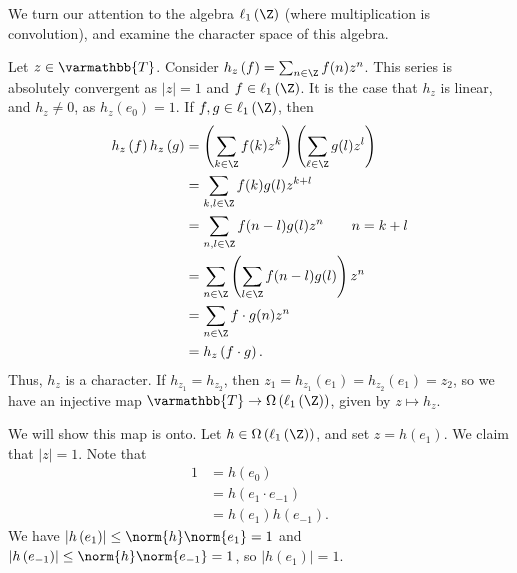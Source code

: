 \documentclass[10pt]{mypackage}
\renewcommand*{\mathbb}[1]{\varmathbb{#1}}
\newcommand{\T}{\mathbb{T}}
\begin{document}
\begin{example}
  We turn our attention to the algebra $\ell_1\left(\Z\right)$ (where multiplication is convolution), and examine the character space of this algebra.\newline

  Let $z\in \T$. Consider $h_z\left(f\right) = \sum_{n\in \Z}f(n)z^n$. This series is absolutely convergent as $\left\vert z \right\vert = 1$ and $f\in \ell_1\left(\Z\right)$. It is the case that $h_z$ is linear, and $h_z\neq 0$, as $h_z\left(e_0\right) = 1$. If $f,g\in \ell_1\left(\Z\right)$, then
  \begin{align*}
    h_z\left(f\right)h_z\left(g\right) &= \left(\sum_{k\in \Z}f(k)z^k\right)\left(\sum_{\ell \in \Z}g(l)z^l\right)\\
                                       &= \sum_{k,l\in \Z}f(k)g(l)z^{k+l}\\
                                       &= \sum_{n,l\in \Z}f(n-l)g(l)z^{n}\tag*{$n=k+l$}\\
                                       &= \sum_{n\in \Z}\left(\sum_{l\in\Z}f(n-l)g(l)\right)z^{n}\\
                                       &= \sum_{n\in \Z}f\cdot g(n)z^n\\
                                       &= h_z\left(f\cdot g\right).
  \end{align*}
  Thus, $h_z$ is a character. If $h_{z_1} = h_{z_2}$, then $z_1 = h_{z_1}\left(e_1\right) = h_{z_2}\left(e_1\right) = z_2$, so we have an injective map $\T\rightarrow \Omega\left(\ell_1\left(\Z\right)\right)$, given by $z\mapsto h_z$.\newline

  We will show this map is onto. Let $h\in \Omega\left(\ell_1\left(\Z\right)\right)$, and set $z = h\left(e_1\right)$. We claim that $\left\vert z \right\vert = 1$. Note that
  \begin{align*}
    1 &= h\left(e_0\right)\\
      &= h\left(e_1\cdot e_{-1}\right)\\
      &= h\left(e_{1}\right)h\left(e_{-1}\right).
  \end{align*}
  We have $\left\vert h\left(e_1\right) \right\vert\leq \norm{h}\norm{e_1} = 1$ and $\left\vert h\left(e_{-1}\right) \right\vert \leq \norm{h}\norm{e_{-1}} = 1$, so $\left\vert h\left(e_1\right) \right\vert=  1$.\newline


\end{example}
\end{document}
